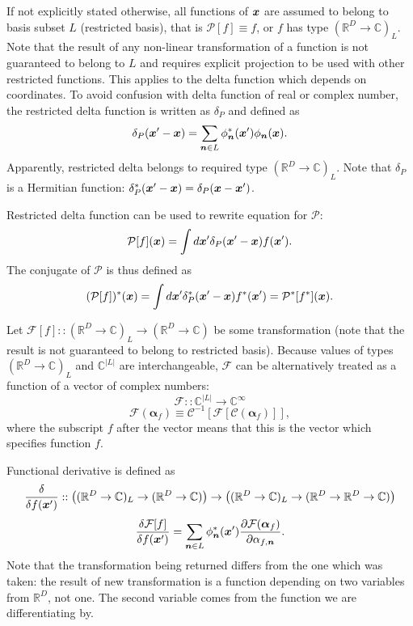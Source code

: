 If not explicitly stated otherwise, all functions of $\boldsymbol{x}$ are assumed to belong to basis subset $L$ (restricted basis),
that is $\mathcal{P}[f] \equiv f$, or $f$ has type $(\mathbb{R}^D \rightarrow \mathbb{C})_L$.
Note that the result of any non-linear transformation of a function is not guaranteed to belong to $L$ and requires explicit projection to be used with other restricted functions.
This applies to the delta function which depends on coordinates.
To avoid confusion with delta function of real or complex number,
the restricted delta function is written as $\delta_P$ and defined as
\begin{equation}
\label{eqn:formalism:func-calculus:restricted-delta}
	\delta_P(\boldsymbol{x}^\prime - \boldsymbol{x})
	= \sum\limits_{\boldsymbol{n} \in L} \phi_{\boldsymbol{n}}^* (\boldsymbol{x}^\prime) \phi_{\boldsymbol{n}} (\boldsymbol{x}).
\end{equation}
Apparently, restricted delta belongs to required type $(\mathbb{R}^D \rightarrow \mathbb{C})_L$.
Note that $\delta_P$ is a Hermitian function: $\delta_P^*(\boldsymbol{x}^\prime - \boldsymbol{x}) = \delta_P(\boldsymbol{x} - \boldsymbol{x}^\prime)$.

Restricted delta function can be used to rewrite equation for $\mathcal{P}$:
\[
	\mathcal{P}[f](\boldsymbol{x}) = \int d\boldsymbol{x}^\prime \delta_P(\boldsymbol{x}^\prime - \boldsymbol{x}) f(\boldsymbol{x}^\prime).
\]
The conjugate of $\mathcal{P}$ is thus defined as
\[
	(\mathcal{P}[f])^*(\boldsymbol{x})
	= \int d\boldsymbol{x}^\prime \delta_P^*(\boldsymbol{x}^\prime - \boldsymbol{x}) f^*(\boldsymbol{x}^\prime)
	= \mathcal{P}^* [f^*](\boldsymbol{x}).
\]

Let $\mathcal{F}[f] :: (\mathbb{R}^D \rightarrow \mathbb{C})_L \rightarrow (\mathbb{R}^D \rightarrow \mathbb{C})$ be some transformation
(note that the result is not guaranteed to belong to restricted basis).
Because values of types $(\mathbb{R}^D \rightarrow \mathbb{C})_L$ and $\mathbb{C}^{|L|}$ are interchangeable,
$\mathcal{F}$ can be alternatively treated as a function of a vector of complex numbers:
\[
	\mathcal{F} :: \mathbb{C}^{|L|} \rightarrow \mathbb{C}^\infty
\]
\[
	\mathcal{F}(\bm{\alpha}_f) \equiv \mathcal{C}^{-1}[\mathcal{F}[\mathcal{C}(\bm{\alpha}_f)]],
\]
where the subscript $f$ after the vector means that this is the vector which specifies function $f$.

Functional derivative is defined as
\[
	\frac{\delta}{\delta f(\boldsymbol{x}^\prime)} ::
	\left(
		(\mathbb{R}^D \rightarrow \mathbb{C})_L
		\rightarrow
		(\mathbb{R}^D \rightarrow \mathbb{C})
	\right)
	\rightarrow
	\left(
		(\mathbb{R}^D \rightarrow \mathbb{C})_L
		\rightarrow
		(\mathbb{R}^D \rightarrow \mathbb{R}^D \rightarrow \mathbb{C})
	\right)
\]
\begin{equation}
\label{eqn:formalism:func-aux:func-diff}
	\frac{\delta \mathcal{F}[f]}{\delta f(\boldsymbol{x}^\prime)}
	= \sum\limits_{\boldsymbol{n} \in L} \phi_{\boldsymbol{n}}^* (\boldsymbol{x}^\prime)
		\frac{\partial \mathcal{F}(\bm{\alpha}_f)}{\partial \alpha_{f,\boldsymbol{n}}}.
\end{equation}
Note that the transformation being returned differs from the one which was taken:
the result of new transformation is a function depending on two variables from $\mathbb{R}^D$, not one.
The second variable comes from the function we are differentiating by.

